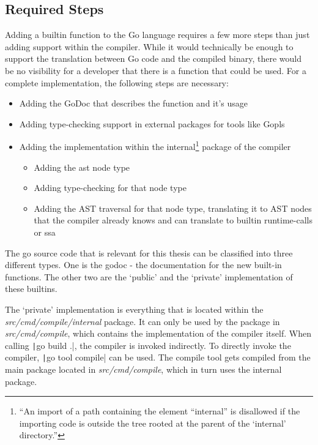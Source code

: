 \subsection{Required Steps}

Adding a builtin function to the Go language requires a few more steps than just
adding support within the compiler. While it would technically be enough to
support the translation between Go code and the compiled binary, there would be
no visibility for a developer that there is a function that could be used.
For a complete implementation, the following steps are necessary:
\begin{itemize}
    \item Adding the GoDoc\autocite{godoc} that describes the function and it's usage
    \item Adding type-checking support in external packages for tools like
    Gopls\autocite{gopls}
    \item Adding the implementation within the internal\footnote{
            ``An import of
            a path containing the element “internal” is disallowed if the
            importing code is outside the tree rooted at the parent of the
            `internal' directory.''\autocite{internal-packages}
        }
        package of the compiler
        \begin{itemize}
            \item Adding the \gls{ast} node type
            \item Adding type-checking for that node type
            \item Adding the AST traversal for that node type, translating it
                to AST nodes that the compiler already knows and can translate
                to builtin runtime-calls or \gls{ssa}
        \end{itemize}
\end{itemize}

The go source code that is relevant for this thesis can be classified into three different
types. One is the godoc - the documentation for the new built-in functions. The
other two are the `public' and the `private' implementation of these builtins.

The `private' implementation is everything that is located within the
\textit{src/cmd/compile/internal} package\autocite{internal-packages}. It can only
be used by the package in \textit{src/cmd/compile}, which contains the
implementation of the compiler itself. When calling \texttt|go build .|,
the compiler is invoked indirectly. To directly invoke the compiler,
\texttt|go tool compile| can be used. The compile tool gets compiled
from the main package located in \textit{src/cmd/compile}, which in turn
uses the internal package.

